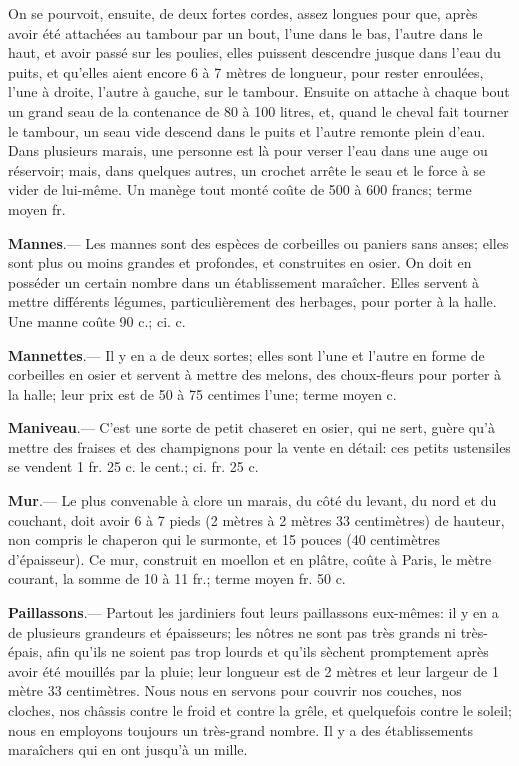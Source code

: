 \documentclass[10pt,a4paper]{book}
\begin{document}
On se pourvoit, ensuite, de deux fortes cordes, assez longues pour que, après avoir été attachées au tambour par un bout, l'une dans le bas, l'autre dans le haut, et avoir passé sur les poulies, elles puissent descendre jusque dans l'eau du puits, et qu'elles aient encore 6 à 7 mètres de longueur, pour rester enroulées, l'une à droite, l'autre à gauche, sur le tambour. Ensuite on attache à chaque bout un grand seau de la contenance de 80 à 100 litres, et, quand le cheval fait tourner le tambour, un seau vide descend dans le puits et l'autre remonte plein d'eau. Dans plusieurs marais, une personne est là pour verser l'eau dans une auge ou réservoir; mais, dans quelques autres, un crochet arrête le seau et le force à se vider de lui-même. Un manège tout monté coûte de 500 à 600 francs; terme moyen  fr.

\textbf{Mannes}.--- Les mannes sont des espèces de corbeilles ou paniers sans anses; elles sont plus ou moins grandes et profondes, et construites en osier. On doit en posséder un certain nombre dans un établissement maraîcher. Elles servent à mettre différents légumes, particulièrement des herbages, pour porter à la halle. Une manne coûte 90 c.; ci. c.

\textbf{Mannettes}.--- Il y en a de deux sortes; elles sont l'une et l'autre en forme de corbeilles en osier et servent à mettre des melons, des choux-fleurs pour porter à la halle; leur prix est de 50 à 75 centimes l'une; terme moyen  c.

\textbf{Maniveau}.--- C'est une sorte de petit chaseret en osier, qui ne sert, guère qu'à mettre des fraises et des champignons pour la vente en détail: ces petits ustensiles se vendent 1 fr. 25 c. le cent.; ci. fr. 25 c.

\textbf{Mur}.--- Le plus convenable à clore un marais, du côté du levant, du nord et du couchant, doit avoir 6 à 7 pieds (2 mètres à 2 mètres 33 centimètres) de hauteur, non compris le chaperon qui le surmonte, et 15 pouces (40 centimètres d'épaisseur). Ce mur, construit en moellon et en plâtre, coûte à Paris, le mètre courant, la somme de 10 à 11 fr.; terme moyen  fr. 50 c.

\textbf{Paillassons}.--- Partout les jardiniers fout leurs paillassons eux-mêmes: il y en a de plusieurs grandeurs et épaisseurs; les nôtres ne sont pas très grands ni très-épais, afin qu'ils ne soient pas trop lourds et qu'ils sèchent promptement après avoir été mouillés par la pluie; leur longueur est de 2 mètres et leur largeur de 1 mètre 33 centimètres. Nous nous en servons pour couvrir nos couches, nos cloches, nos châssis contre le froid et contre la grêle, et quelquefois contre le soleil; nous en employons toujours un très-grand nombre. Il y a des établissements maraîchers qui en ont jusqu'à un mille.
\end{document}
